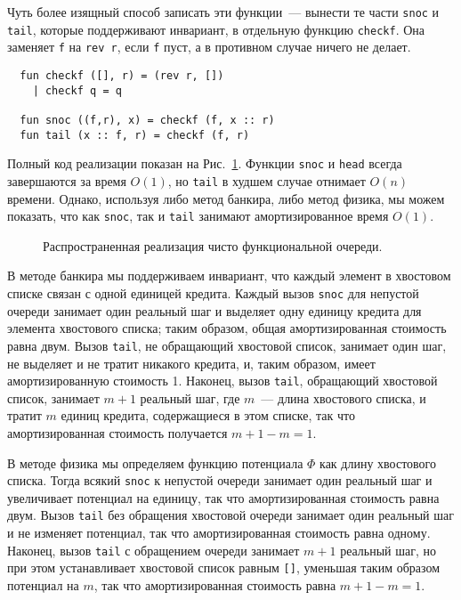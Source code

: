 Чуть более изящный способ записать эти функции~--- вынести те части
\lstinline!snoc! и \lstinline!tail!, которые поддерживают инвариант, в
отдельную функцию \lstinline!checkf!. Она заменяет \lstinline!f! на
\lstinline!rev r!, если \lstinline!f! пуст, а в противном случае
ничего не делает.
\begin{lstlisting}
  fun checkf ([], r) = (rev r, [])
    | checkf q = q

  fun snoc ((f,r), x) = checkf (f, x :: r)
  fun tail (x :: f, r) = checkf (f, r)
\end{lstlisting}
Полный код реализации показан на Рис.~\ref{fig:5.2}. Функции
\lstinline!snoc! и \lstinline!head! всегда завершаются за время
$O(1)$, но \lstinline!tail! в худшем случае отнимает $O(n)$
времени. Однако, используя либо метод банкира, либо метод физика, мы
можем показать, что как \lstinline!snoc!, так и \lstinline!tail!
занимают амортизированное время $O(1)$.

\begin{figure}
  \centering
  
  \caption{Распространенная реализация чисто функциональной очереди.}
  \label{fig:5.2}
\end{figure}

В методе банкира мы поддерживаем инвариант, что каждый элемент в
хвостовом списке связан с одной единицей кредита. Каждый вызов
\lstinline!snoc! для непустой очереди занимает один реальный шаг и
выделяет одну единицу кредита для элемента хвостового списка; таким
образом, общая амортизированная стоимость равна двум. Вызов
\lstinline!tail!, не обращающий хвостовой список, занимает один шаг,
не выделяет и не тратит никакого кредита, и, таким образом, имеет
амортизированную стоимость 1. Наконец, вызов \lstinline!tail!,
обращающий хвостовой список, занимает $m+1$ реальный шаг, где $m$~---
длина хвостового списка, и тратит $m$ единиц кредита, содержащиеся в
этом списке, так что амортизированная стоимость получается $m + 1 - m
= 1$.

В методе физика мы определяем функцию потенциала $\Phi$ как длину
хвостового списка. Тогда всякий \lstinline!snoc! к непустой очереди
занимает один реальный шаг и увеличивает потенциал на единицу, так что
амортизированная стоимость равна двум. Вызов \lstinline!tail! без
обращения хвостовой очереди занимает один реальный шаг и не изменяет
потенциал, так что амортизированная стоимость равна одному. Наконец,
вызов \lstinline!tail! с обращением очереди занимает $m+1$ реальный
шаг, но при этом устанавливает хвостовой список равным \lstinline![]!,
уменьшая таким образом потенциал на $m$, так что амортизированная
стоимость равна $m + 1 - m = 1$.

